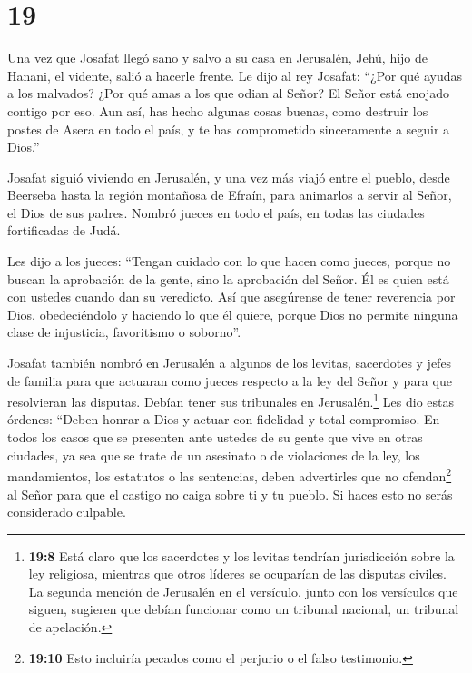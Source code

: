 \hypertarget{section-18}{%
\section{19}\label{section-18}}

 Una vez que Josafat llegó sano y salvo a su casa en
Jerusalén,  Jehú, hijo de Hanani, el vidente, salió a
hacerle frente. Le dijo al rey Josafat: ``¿Por qué ayudas a los
malvados? ¿Por qué amas a los que odian al Señor? El Señor está enojado
contigo por eso.  Aun así, has hecho algunas cosas buenas,
como destruir los postes de Asera en todo el país, y te has comprometido
sinceramente a seguir a Dios.''

 Josafat siguió viviendo en Jerusalén, y una vez más viajó
entre el pueblo, desde Beerseba hasta la región montañosa de Efraín,
para animarlos a servir al Señor, el Dios de sus padres. 
Nombró jueces en todo el país, en todas las ciudades fortificadas de
Judá.

 Les dijo a los jueces: ``Tengan cuidado con lo que hacen
como jueces, porque no buscan la aprobación de la gente, sino la
aprobación del Señor. Él es quien está con ustedes cuando dan su
veredicto.  Así que asegúrense de tener reverencia por Dios,
obedeciéndolo y haciendo lo que él quiere, porque Dios no permite
ninguna clase de injusticia, favoritismo o soborno''.

 Josafat también nombró en Jerusalén a algunos de los
levitas, sacerdotes y jefes de familia para que actuaran como jueces
respecto a la ley del Señor y para que resolvieran las disputas. Debían
tener sus tribunales en Jerusalén.\footnote{\textbf{19:8} Está claro que
  los sacerdotes y los levitas tendrían jurisdicción sobre la ley
  religiosa, mientras que otros líderes se ocuparían de las disputas
  civiles. La segunda mención de Jerusalén en el versículo, junto con
  los versículos que siguen, sugieren que debían funcionar como un
  tribunal nacional, un tribunal de apelación.}  Les dio
estas órdenes: ``Deben honrar a Dios y actuar con fidelidad y total
compromiso.  En todos los casos que se presenten ante
ustedes de su gente que vive en otras ciudades, ya sea que se trate de
un asesinato o de violaciones de la ley, los mandamientos, los estatutos
o las sentencias, deben advertirles que no ofendan\footnote{\textbf{19:10}
  Esto incluiría pecados como el perjurio o el falso testimonio.} al
Señor para que el castigo no caiga sobre ti y tu pueblo. Si haces esto
no serás considerado culpable.

